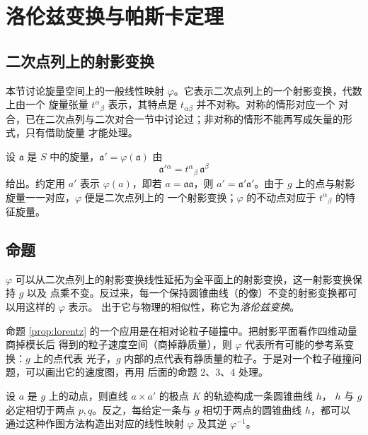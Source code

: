 \chapter{洛伦兹变换与帕斯卡定理}

\section{二次点列上的射影变换}

本节讨论旋量空间上的一般线性映射 $\varphi$。它表示二次点列上的一个射影变换，代数上由一个
旋量张量 ${t^\alpha}_\beta$ 表示，其特点是 $t_{\alpha\beta}$ 并不对称。对称的情形对应一个
对合，已在二次点列与二次对合一节中讨论过；非对称的情形不能再写成矢量的形式，只有借助旋量
才能处理。

设 $\mathfrak a$ 是 $S$ 中的旋量，$\mathfrak a' =\varphi(\mathfrak a)$ 由
\begin{equation}\label{eq:varphi}
\mathfrak a'{}^\alpha=t^\alpha{}_\beta\,\mathfrak a^\beta
\end{equation}
给出。约定用 $a'$ 表示 $\varphi(a)$，即若 $a=\mathfrak a\mathfrak a$，则
$a'=\mathfrak a'\mathfrak a'$。由于 $g$ 上的点与射影旋量一一对应，$\varphi$ 便是二次点列上的
一个射影变换；$\varphi$ 的不动点对应于 $t^\alpha{}_\beta$ 的特征旋量。

\section{命题}

\begin{proposition}\label{prop:lorentz}
$\varphi$ 可以从二次点列上的射影变换线性延拓为全平面上的射影变换，这一射影变换保持 $g$ 以及
点乘不变。反过来，每一个保持圆锥曲线（的像）不变的射影变换都可以用这样的 $\varphi$ 表示。
出于它与物理的相似性，称它为\emph{洛伦兹变换}。
\end{proposition}

\begin{remark}[与相对论速度空间的类比]
命题 \ref{prop:lorentz} 的一个应用是在相对论粒子碰撞中。把射影平面看作四维动量商掉模长后
得到的粒子速度空间（商掉静质量），则 $\varphi$ 代表所有可能的参考系变换：$g$ 上的点代表
光子，$g$ 内部的点代表有静质量的粒子。于是对一个粒子碰撞问题，可以画出它的速度图，再用
后面的命题 2、3、4 处理。
\end{remark}

\begin{proposition}\label{prop:locus}
设 $a$ 是 $g$ 上的动点，则直线 $a\times a'$ 的极点 $K$ 的轨迹构成一条圆锥曲线 $h$，
$h$ 与 $g$ 必定相切于两点 $p,q$。反之，每给定一条与 $g$ 相切于两点的圆锥曲线 $h$，都可以
通过这种作图方法构造出对应的线性映射 $\varphi$ 及其逆 $\varphi^{-1}$。
\end{proposition}

